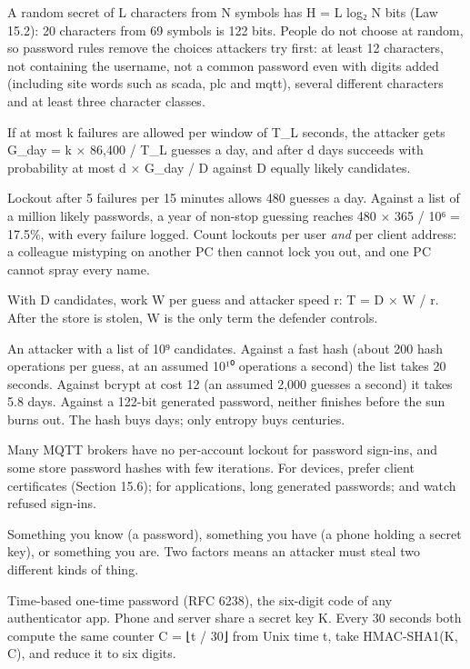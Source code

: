 A random secret of L characters from N symbols has H = L log₂ N bits (Law 15.2): 20 characters from 69 symbols is 122 bits. People do not choose at random, so password rules remove the choices attackers try first: at least 12 characters, not containing the username, not a common password even with digits added (including site words such as scada, plc and mqtt), several different characters and at least three character classes.

 If at most k failures are allowed per window of T\_L seconds, the attacker gets G\_day = k × 86,400 / T\_L guesses a day, and after d days succeeds with probability at most d × G\_day / D against D equally likely candidates.

 Lockout after 5 failures per 15 minutes allows 480 guesses a day. Against a list of a million likely passwords, a year of non-stop guessing reaches 480 × 365 / 10⁶ = 17.5\%, with every failure logged. Count lockouts per user \emph{and} per client address: a colleague mistyping on another PC then cannot lock you out, and one PC cannot spray every name.

 With D candidates, work W per guess and attacker speed r: T = D × W / r. After the store is stolen, W is the only term the defender controls.

 An attacker with a list of 10⁹ candidates. Against a fast hash (about 200 hash operations per guess, at an assumed 10¹⁰ operations a second) the list takes 20 seconds. Against bcrypt at cost 12 (an assumed 2,000 guesses a second) it takes 5.8 days. Against a 122-bit generated password, neither finishes before the sun burns out. The hash buys days; only entropy buys centuries.

 Many MQTT brokers have no per-account lockout for password sign-ins, and some store password hashes with few iterations. For devices, prefer client certificates (Section 15.6); for applications, long generated passwords; and watch refused sign-ins.

 Something you know (a password), something you have (a phone holding a secret key), or something you are. Two factors means an attacker must steal two different kinds of thing.

 Time-based one-time password (RFC 6238), the six-digit code of any authenticator app. Phone and server share a secret key K. Every 30 seconds both compute the same counter C = ⌊t / 30⌋ from Unix time t, take HMAC-SHA1(K, C), and reduce it to six digits.


